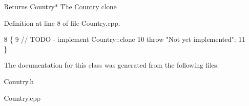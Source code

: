 \begin{DoxyReturn}{Returns}
Country$\ast$ The \hyperlink{classCountry}{Country} clone 
\end{DoxyReturn}


Definition at line 8 of file Country.\+cpp.


\begin{DoxyCode}
8                         \{
9     \textcolor{comment}{// TODO - implement Country::clone}
10     \textcolor{keywordflow}{throw} \textcolor{stringliteral}{"Not yet implemented"};
11 \}
\end{DoxyCode}


The documentation for this class was generated from the following files\+:\begin{DoxyCompactItemize}
\item 
Country.\+h\item 
Country.\+cpp\end{DoxyCompactItemize}
